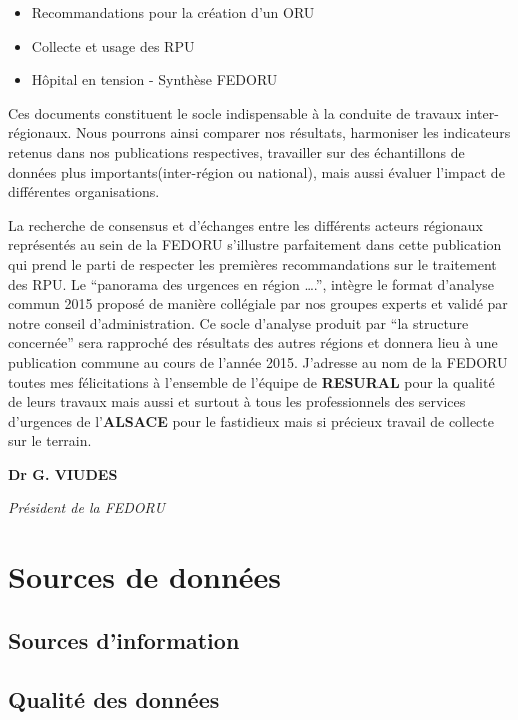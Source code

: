 \documentclass[]{article}
\begin{document}
\begin{itemize}
\itemsep1pt\parskip0pt
\item
  Recommandations pour la création d'un ORU
\item
  Collecte et usage des RPU
\item
  Hôpital en tension - Synthèse FEDORU
\end{itemize}

Ces documents constituent le socle indispensable à la conduite de
travaux inter-régionaux. Nous pourrons ainsi comparer nos résultats,
harmoniser les indicateurs retenus dans nos publications respectives,
travailler sur des échantillons de données plus importants(inter-région
ou national), mais aussi évaluer l'impact de différentes organisations.

La recherche de consensus et d'échanges entre les différents acteurs
régionaux représentés au sein de la FEDORU s'illustre parfaitement dans
cette publication qui prend le parti de respecter les premières
recommandations sur le traitement des RPU. Le ``panorama des urgences en
région \ldots{}.'', intègre le format d'analyse commun 2015 proposé de
manière collégiale par nos groupes experts et validé par notre conseil
d'administration. Ce socle d'analyse produit par ``la structure
concernée'' sera rapproché des résultats des autres régions et donnera
lieu à une publication commune au cours de l'année 2015. J'adresse au
nom de la FEDORU toutes mes félicitations à l'ensemble de l'équipe de
\textbf{RESURAL} pour la qualité de leurs travaux mais aussi et surtout
à tous les professionnels des services d'urgences de l'\textbf{ALSACE}
pour le fastidieux mais si précieux travail de collecte sur le terrain.

\textbf{Dr G. VIUDES}

\emph{Président de la FEDORU}

\section{Sources de données}\label{sources-de-donnees}

\subsection{Sources d'information}\label{sources-dinformation}

\subsection{Qualité des données}\label{qualite-des-donnees}
\end{document}
